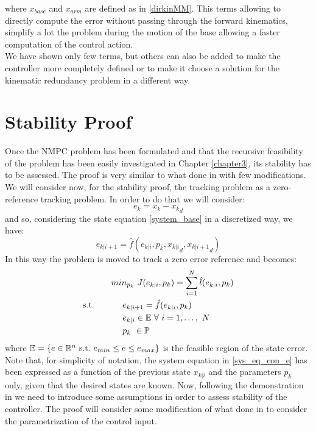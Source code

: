 where $x_{base}$ and $x_{arm}$ are defined as in \ref{dirkinMM}.
This terms allowing to directly compute the error without passing through the forward kinematics, simplify a lot the problem during the motion of the base allowing a faster computation of the control action.\\We have shown only few terms, but others can also be added to make the controller more completely defined or to make it choose a solution for the kinematic redundancy problem in a different way. 

\section{Stability Proof}\label{stabproof}

Once the NMPC problem has been formulated and that the recursive feasibility of the problem has been easily investigated in Chapter \ref{chapter3}, its stability has to be assessed. 
The proof is very similar to what done in \cite{alamir2018stability} with few modifications. We will consider now, for the stability proof, the tracking problem as a zero-reference tracking problem. In order to do that we will consider:
\begin{equation}
    e_k=x_k-{x_k}_d
\end{equation}
and so, considering the state equation \ref{system_base} in a discretized way, we have:
\begin{equation}\label{sys_eq_con_e}
    e_{k|i+1}=\hat{f}(e_{k|i},p_k,{x_{k|i}}_d,{x_{k|i+1}}_d)
\end{equation}
In this way the problem is moved to track a zero error reference and becomes: 
\begin{equation} \label{ourproblem_stab}
\begin{split}
		& min_{{p}_k}\ J({e}_{k|i},{p}_k) =\sum_{i=1}^{N}\hat{l}(e_{k|i},{p}_{k}) \\
		\textnormal{s.t.}\qquad
		&\ \ \ \ e_{k|i+1}=\hat{f}(e_{k|i},p_k) \\
		&\ \ \ \ e_{k|i} \in \mathbb{E}\ \forall\ i=1,\dots,\ N  \\
		&\ \ \ \ {p}_k\   \in \mathbb{P}\ \\
	\end{split}	
\end{equation}
where $\mathbb{E} = \lbrace {e}\in \mathbb{R}^n\ \textnormal{s.t.}\ {e}_{min}\leq e\leq e_{max} \rbrace$ is the feasible region of the state error. Note that, for simplicity of notation, the system equation in \ref{sys_eq_con_e} has been expressed as a function of the previous state ${x_{k|i}}$ and the parameters $p_k$ only, given that the desired states are known.
Now, following the demonstration in \cite{alamir2018stability} we need to introduce some assumptions in order to assess stability of the controller. The proof will consider some modification of what done in \cite{alamir2018stability} to consider the parametrization of the control input. 

